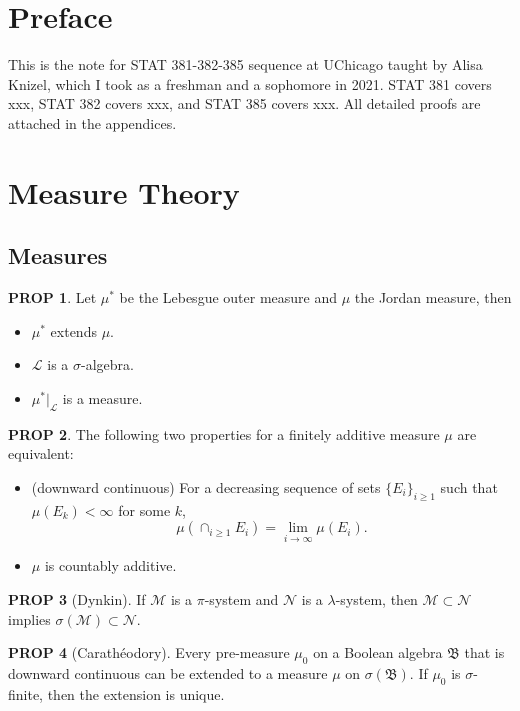 \documentclass[hidelinks,11pt]{article}
\theoremstyle{definition}
\theoremstyle{dotles}
\theoremstyle{dotless}
\newtheorem{prop}{PROP}[section]
\theoremstyle{remark}
\begin{document}
\section*{Preface}
This is the note for STAT 381-382-385 sequence at UChicago taught by Alisa Knizel, which I took as a freshman and a sophomore in 2021. STAT 381 covers xxx, STAT 382 covers xxx, and STAT 385 covers xxx. All detailed proofs are attached in the appendices.
\tableofcontents
\newpage

\section{Measure Theory}

\subsection{Measures}

\begin{prop}\label{Prop 1.1}
Let $\mu^*$ be the Lebesgue outer measure and $\mu$ the Jordan measure, then\begin{itemize}
    \item $\mu^*$ extends $\mu$.
    \item $\mathcal{L}$ is a $\sigma$-algebra.
    \item $\mu^*|_\mathcal{L}$ is a measure.
\end{itemize}
\end{prop}

\begin{prop}\label{Prop 1.2}
The following two properties for a finitely additive measure $\mu$ are equivalent:\begin{itemize}
    \item \textup{(downward continuous)} For a decreasing sequence of sets $\{E_i\}_{i\geq1}$ such that $\mu(E_k)<\infty$ for some $k$,
    \[\mu(\cap_{i\geq1}E_i)=\lim_{i\to\infty}\mu(E_i).\]
    \item $\mu$ is countably additive.
\end{itemize}
\end{prop}

\begin{prop}[Dynkin]\label{Prop 1.3}
If $\mathcal{M}$ is a $\pi$-system and $\mathcal{N}$ is a $\lambda$-system, then $\mathcal{M}\subset\mathcal{N}$ implies $\sigma(\mathcal{M})\subset\mathcal{N}$.
\end{prop}

\begin{prop}[Carathéodory]\label{Prop 1.4}
Every pre-measure $\mu_0$ on a Boolean algebra $\mathfrak{B}$ that is downward continuous can be extended to a measure $\mu$ on $\sigma(\mathfrak{B})$. If $\mu_0$ is $\sigma$-finite, then the extension is unique.
\end{prop}
\end{document}
